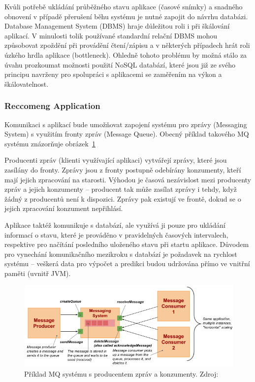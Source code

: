 \documentclass[thesis=M,czech]{FITthesis}[2014/05/07]
\begin{document}
Kvůli potřebě ukládání průběžného stavu aplikace (časové snímky) a snadného obnovení v případě přerušení běhu systému je nutné zapojit do návrhu databázi. Database Management System (DBMS) hraje důležitou roli i při škálování aplikací. V minulosti tolik používané standardní relační DBMS mohou způsobovat zpoždění při provádění čtení/zápisu a v některých případech hrát roli úzkého hrdla aplikace (bottleneck). Ohledně tohoto problému by možná stálo za úvahu prozkoumat možnosti použití NoSQL databází, které jsou již ze svého principu navrženy pro spolupráci s aplikacemi se zaměřením na výkon a škálovatelnost.

\subsubsection{Reccomeng Application}

Komunikaci s aplikací bude umožňovat zapojení systému pro zprávy (Messaging System) s využitím fronty zpráv (Message Queue). Obecný příklad takového MQ systému znázorňuje obrázek~\ref{fig:vitvarMq}

Producenti zpráv (klienti využívající aplikaci) vytvářejí zprávy, které jsou zasílány do fronty. Zprávy jsou z fronty postupně odebírány konzumenty, kteří mají jejich zpracování na starosti. Výhodou je časová nezávislost mezi producenty zpráv a jejich konzumenty – producent tak může zasílat zprávy i tehdy, když žádný z producentů není k dispozici. Zprávy pak existují ve frontě, dokud se o jejich zpracování konzument nepřihlásí.

Aplikace taktéž komunikuje s databází, ale využívá ji pouze pro ukládání informací o stavu, které je prováděno v pravidelných časových intervalech, respektive pro načítání posledního uloženého stavu při startu aplikace. Důvodem pro vynechání komunikačního mezikroku s databází je požadavek na rychlost systému – veškerá data pro výpočet a predikci budou udržována přímo ve vnitřní paměti (uvnitř JVM). 

\begin{figure}\centering
	\includegraphics[width=1.2\textwidth]{obr/vitvar_mq.png}
 	\caption[Příklad MQ systému s producentem zpráv a konzumenty]{Příklad MQ systému s producentem zpráv a konzumenty. Zdroj: \cite{vitvarMq}}\label{fig:vitvarMq}
\end{figure}	
\end{document}
